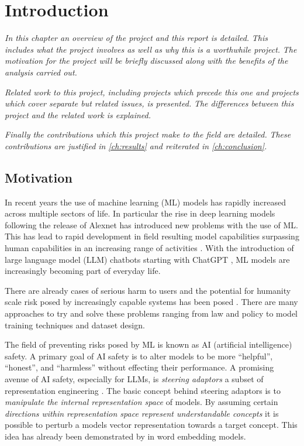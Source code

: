 \chapter{Introduction}
\label{ch:introduction}

\emph{In this chapter an overview of the project and this report is detailed.}
\emph{This includes what the project involves as well as why this is a worthwhile project.}
\emph{The motivation for the project will be briefly discussed along with the benefits of the analysis carried out.}

\emph{Related work to this project, including projects which precede this one and projects which cover separate but related issues, is presented.}
\emph{The differences between this project and the related work is explained.}

\emph{Finally the contributions which this project make to the field are detailed.}
\emph{These contributions are justified in \cref{ch:results} and reiterated in \cref{ch:conclusion}.}

\section{Motivation}

In recent years the use of machine learning (ML) models has rapidly increased across multiple sectors of life.
In particular the rise in deep learning models following the release of Alexnet \citep{alexnet} has introduced new problems with the use of ML.
This has lead to rapid development in field resulting  model capabilities surpassing human capabilities in an increasing range of activities \citep{dynabench, gpt-5, grok-4, hle}.
With the introduction of large language model (LLM) chatbots starting with ChatGPT \citep{chatgpt}, ML models are increasingly becoming part of everyday life.

There are already cases of serious harm to users \citep{c.ai, psychosis} and the potential for humanity scale risk posed by increasingly capable systems has been posed \citep{survellience, deepfakes, disempowerment}.
There are many approaches to try and solve these problems ranging from law and policy to model training techniques and dataset design.

The field of preventing risks posed by ML is known as AI (artificial intelligence) safety.
A primary goal of AI safety is to alter models to be more ``helpful'', ``honest'', and ``harmless'' without effecting their performance.
A promising avenue of AI safety, especially for LLMs, is \emph{steering adaptors} a subset of representation engineering \citep{steering-taxonomy}.
The basic concept behind steering adaptors is to \emph{manipulate the internal representation space} of models.
By assuming certain \emph{directions within representation space represent understandable concepts} it is possible to perturb a models vector representation towards a target concept.
This idea has already been demonstrated by \citet{word2vec} in word embedding models.

